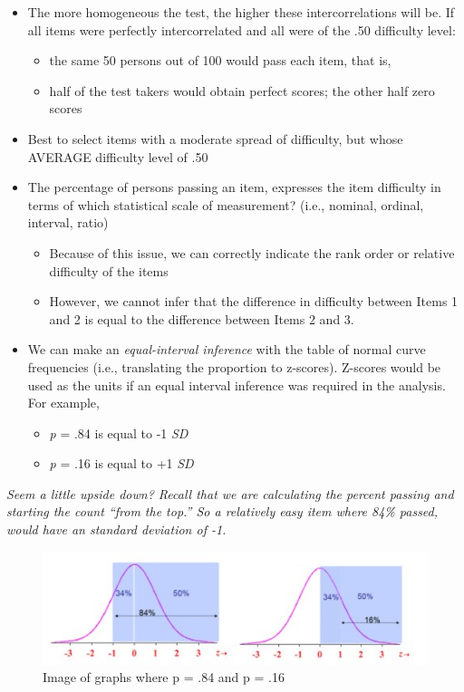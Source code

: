 \documentclass[
  english,
]{book}
\providecommand{\tightlist}{%
  \setlength{\itemsep}{0pt}\setlength{\parskip}{0pt}}
\begin{document}
\begin{itemize}
\tightlist
\item
  The more homogeneous the test, the higher these intercorrelations will be. If all items were perfectly intercorrelated and all were of the .50 difficulty level:

  \begin{itemize}
  \tightlist
  \item
    the same 50 persons out of 100 would pass each item, that is,
  \item
    half of the test takers would obtain perfect scores; the other half zero scores
  \end{itemize}
\item
  Best to select items with a moderate spread of difficulty, but whose AVERAGE difficulty level of .50
\item
  The percentage of persons passing an item, expresses the item difficulty in terms of which statistical scale of measurement? (i.e., nominal, ordinal, interval, ratio)

  \begin{itemize}
  \tightlist
  \item
    Because of this issue, we can correctly indicate the rank order or relative difficulty of the items
  \item
    However, we cannot infer that the difference in difficulty between Items 1 and 2 is equal to the difference between Items 2 and 3.
  \end{itemize}
\item
  We can make an \emph{equal-interval inference} with the table of normal curve frequencies (i.e., translating the proportion to z-scores). Z-scores would be used as the units if an equal interval inference was required in the analysis. For example,

  \begin{itemize}
  \tightlist
  \item
    \emph{p} = .84 is equal to -1 \emph{SD}
  \item
    \emph{p} = .16 is equal to +1 \emph{SD}
  \end{itemize}
\end{itemize}

\emph{Seem a little upside down? Recall that we are calculating the percent passing and starting the count ``from the top.'' So a relatively easy item where 84\% passed, would have an standard deviation of -1.}

\begin{figure}
\centering
\includegraphics{images/ItemAnalExam/p84p16.jpg}
\caption{Image of graphs where p = .84 and p = .16}
\end{figure}
\end{document}
